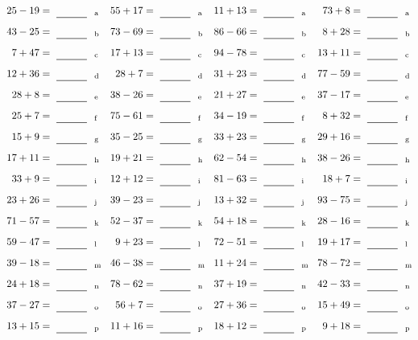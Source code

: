 \documentclass
[
  draft    = true,
  fontsize = 11pt,
  parskip  = half-
]
{scrartcl}
\begin{document}
\clearpage
\begin{align*}
    \pline{25-19}&=\rline{a}
  & \pline{55+17}&=\rline{a}
  & \pline{11+13}&=\rline{a}
  & \pline{73+8}&=\rline{a} \\[1ex]
    \pline{43-25}&=\rline{b}
  & \pline{73-69}&=\rline{b}
  & \pline{86-66}&=\rline{b}
  & \pline{8+28}&=\rline{b} \\[1ex]
    \pline{7+47}&=\rline{c}
  & \pline{17+13}&=\rline{c}
  & \pline{94-78}&=\rline{c}
  & \pline{13+11}&=\rline{c} \\[1ex]
    \pline{12+36}&=\rline{d}
  & \pline{28+7}&=\rline{d}
  & \pline{31+23}&=\rline{d}
  & \pline{77-59}&=\rline{d} \\[1ex]
    \pline{28+8}&=\rline{e}
  & \pline{38-26}&=\rline{e}
  & \pline{21+27}&=\rline{e}
  & \pline{37-17}&=\rline{e} \\[1ex]
    \pline{25+7}&=\rline{f}
  & \pline{75-61}&=\rline{f}
  & \pline{34-19}&=\rline{f}
  & \pline{8+32}&=\rline{f} \\[1ex]
    \pline{15+9}&=\rline{g}
  & \pline{35-25}&=\rline{g}
  & \pline{33+23}&=\rline{g}
  & \pline{29+16}&=\rline{g} \\[1ex]
    \pline{17+11}&=\rline{h}
  & \pline{19+21}&=\rline{h}
  & \pline{62-54}&=\rline{h}
  & \pline{38-26}&=\rline{h} \\[1ex]
    \pline{33+9}&=\rline{i}
  & \pline{12+12}&=\rline{i}
  & \pline{81-63}&=\rline{i}
  & \pline{18+7}&=\rline{i} \\[1ex]
    \pline{23+26}&=\rline{j}
  & \pline{39-23}&=\rline{j}
  & \pline{13+32}&=\rline{j}
  & \pline{93-75}&=\rline{j} \\[1ex]
    \pline{71-57}&=\rline{k}
  & \pline{52-37}&=\rline{k}
  & \pline{54+18}&=\rline{k}
  & \pline{28-16}&=\rline{k} \\[1ex]
    \pline{59-47}&=\rline{l}
  & \pline{9+23}&=\rline{l}
  & \pline{72-51}&=\rline{l}
  & \pline{19+17}&=\rline{l} \\[1ex]
    \pline{39-18}&=\rline{m}
  & \pline{46-38}&=\rline{m}
  & \pline{11+24}&=\rline{m}
  & \pline{78-72}&=\rline{m} \\[1ex]
    \pline{24+18}&=\rline{n}
  & \pline{78-62}&=\rline{n}
  & \pline{37+19}&=\rline{n}
  & \pline{42-33}&=\rline{n} \\[1ex]
    \pline{37-27}&=\rline{o}
  & \pline{56+7}&=\rline{o}
  & \pline{27+36}&=\rline{o}
  & \pline{15+49}&=\rline{o} \\[1ex]
    \pline{13+15}&=\rline{p}
  & \pline{11+16}&=\rline{p}
  & \pline{18+12}&=\rline{p}
  & \pline{9+18}&=\rline{p}
\end{align*}
\end{document}
